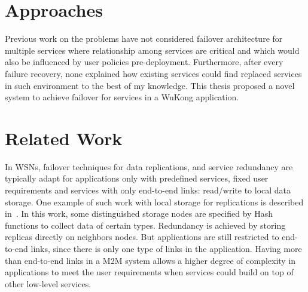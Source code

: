 

\section{Approaches}

Previous work on the problems have not considered failover architecture for
multiple services where relationship among services are critical and which would
also be influenced by user policies pre-deployment. Furthermore, after every
failure recovery, none explained how existing services could find replaced
services in such environment to the best of my knowledge. This thesis proposed
a novel system to achieve failover for services in a WuKong application.

\section{Related Work}

In WSNs, failover techniques for data replications, and service redundancy are
typically adapt for applications only with predefined services, fixed user
requirements and services with only end-to-end links: read/write to local data
storage. One example of such work with local storage for replications is
described in~\cite{Ratnasamy2002}. In this work, some distinguished storage
nodes are specified by Hash functions to collect data of certain types.
Redundancy is achieved by storing replicas directly on neighbors nodes. But
applications are still restricted to end-to-end links, since there is only one
type of links in the application.
Having more than end-to-end links in a M2M system allows a higher degree of
complexity in applications to meet the user requirements when services could
build on top of other low-level services.

